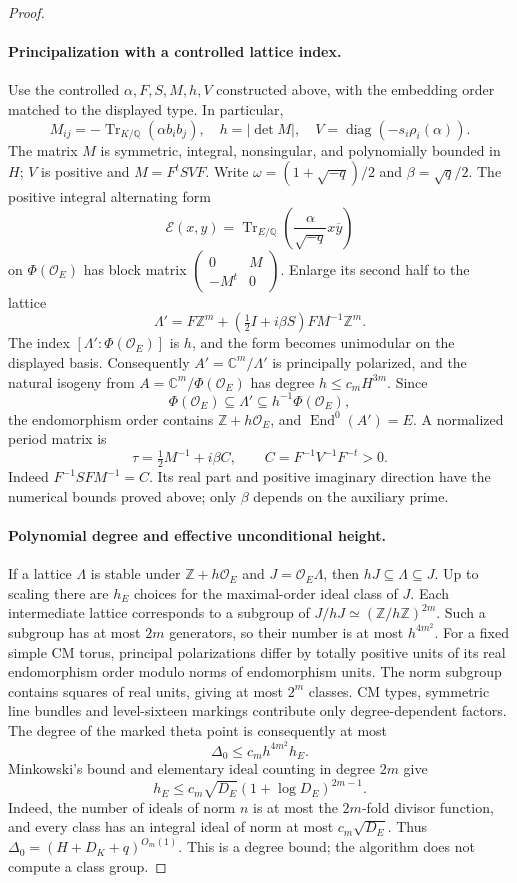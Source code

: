 \documentclass[11pt]{article}
\theoremstyle{definition}
\theoremstyle{remark}
\begin{document}
\begin{proof}
\paragraph{Principalization with a controlled lattice index.}
Use the controlled $\alpha,F,S,M,h,V$ constructed above, with the
embedding order matched to the displayed type.  In particular,
\[
 M_{ij}=-\operatorname{Tr}_{K/\mathbb Q}(\alpha b_i b_j),
 \quad h=|\det M|,
 \quad V=\operatorname{diag}(-s_i\rho_i(\alpha)).
\]
The matrix $M$ is symmetric, integral, nonsingular, and polynomially bounded in $H$;
$V$ is positive and $M=F^tSVF$.  Write
$\omega=(1+\sqrt{-q})/2$ and $\beta=\sqrt q/2$.
The positive integral alternating form
\[
 \mathcal E(x,y)=\operatorname{Tr}_{E/\mathbb Q}
 \left(\frac{\alpha}{\sqrt{-q}}x\overline y\right)
\]
on $\Phi(\mathcal O_E)$ has block matrix
$\left(\begin{smallmatrix}0&M\\-M^t&0\end{smallmatrix}\right)$.
Enlarge its second half to the lattice
\[
 \Lambda'=F\mathbb Z^m+
 \left(\tfrac12 I+i\beta S\right)FM^{-1}\mathbb Z^m.
\]
The index $[\Lambda':\Phi(\mathcal O_E)]$ is $h$, and the form becomes
unimodular on the displayed basis.  Consequently
$A'=\mathbb C^m/\Lambda'$ is principally polarized, and the natural isogeny
from $A=\mathbb C^m/\Phi(\mathcal O_E)$ has degree $h\leq c_mH^{3m}$.  Since
\[
 \Phi(\mathcal O_E)\subseteq\Lambda'
 \subseteq h^{-1}\Phi(\mathcal O_E),
\]
the endomorphism order contains $\mathbb Z+h\mathcal O_E$, and
$\operatorname{End}^0(A')=E$.  A normalized period matrix is
\[
 \tau=\tfrac12 M^{-1}+i\beta C,
 \qquad C=F^{-1}V^{-1}F^{-t}>0.
\]
Indeed $F^{-1}SF M^{-1}=C$.  Its real part and positive imaginary direction have the numerical bounds
proved above; only $\beta$ depends on the auxiliary prime.

\paragraph{Polynomial degree and effective unconditional height.}
If a lattice $\Lambda$ is stable under $\mathbb Z+h\mathcal O_E$ and
$J=\mathcal O_E\Lambda$, then $hJ\subseteq\Lambda\subseteq J$.
Up to scaling there are $h_E$ choices for the maximal-order ideal class of
$J$.  Each intermediate lattice corresponds to a subgroup of
$J/hJ\simeq(\mathbb Z/h\mathbb Z)^{2m}$.  Such a subgroup has at most $2m$
generators, so their number is at most $h^{4m^2}$.
For a fixed simple CM torus, principal polarizations differ by totally
positive units of its real endomorphism order modulo norms of endomorphism
units.  The norm subgroup contains squares of real units, giving at most
$2^m$ classes.  CM types, symmetric line bundles and level-sixteen markings
contribute only degree-dependent factors.  The degree of the marked theta
point is consequently at most
\[
 \Delta_0\leq c_mh^{4m^2}h_E.
\]
Minkowski's bound and elementary ideal counting in degree $2m$ give
\[
 h_E\leq c_m\sqrt{D_E}(1+\log D_E)^{2m-1}.
\]
Indeed, the number of ideals of norm $n$ is at most the $2m$-fold divisor
function, and every class has an integral ideal of norm at most
$c_m\sqrt{D_E}$.  Thus $\Delta_0=(H+D_K+q)^{O_m(1)}$.
This is a degree bound; the algorithm does not compute a class group.


\end{proof}
\end{document}
